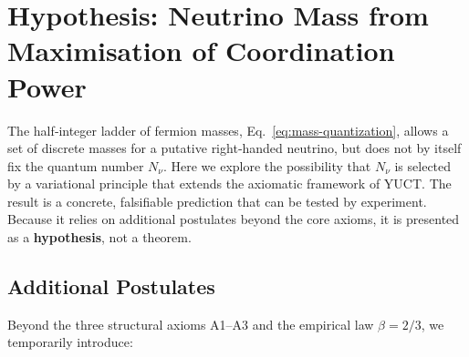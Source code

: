 \documentclass[12pt,a4paper]{article}
\begin{document}
	\section{Hypothesis: Neutrino Mass from Maximisation of Coordination Power}
	\label{sec:neutrino-hypothesis}
	
	The half‑integer ladder of fermion masses, Eq.~\eqref{eq:mass-quantization}, allows a set of discrete masses for a putative right‑handed neutrino, but does not by itself fix the quantum number \(N_{\nu}\).  Here we explore the possibility that \(N_{\nu}\) is selected by a variational principle that extends the axiomatic framework of YUCT.  The result is a concrete, falsifiable prediction that can be tested by experiment.  Because it relies on additional postulates beyond the core axioms, it is presented as a \textbf{hypothesis}, not a theorem.
	
	\subsection{Additional Postulates}
	
	Beyond the three structural axioms A1--A3 and the empirical law \(\beta=2/3\), we temporarily introduce:
	
\end{document}
